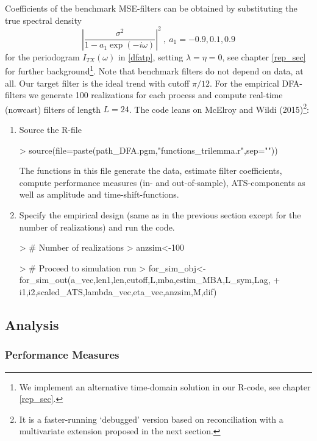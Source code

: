 \documentclass[a4paper]{book}
\begin{document}
Coefficients of the benchmark MSE-filters can be obtained by substituting the true spectral density
\[\left|\frac{\sigma^2}{1-a_1\exp(-i\omega)}\right|^2~,~a_1=-0.9,0.1,0.9\]
for the periodogram $I_{TX}(\omega)$ in \ref{dfatp}, setting $\lambda=\eta=0$, see chapter \ref{rep_sec} for further background\footnote{We implement an alternative time-domain solution in our R-code, see chapter \ref{rep_sec}.}. Note that benchmark filters do not depend on data, at all. Our target filter is the ideal trend with cutoff $\pi/12$.  
For the empirical DFA-filters we generate 100 realizations for each process and compute real-time (nowcast) filters of length $L=24$. The code leans on McElroy and Wildi (2015)\footnote{It is a faster-running `debugged' version based on reconciliation with a multivariate extension proposed in the next section.}:
\begin{enumerate}
\item Source the R-file
\begin{Schunk}
\begin{Sinput}
> source(file=paste(path_DFA.pgm,"functions_trilemma.r",sep=""))
\end{Sinput}
\end{Schunk}
The functions in this file generate the data, estimate filter coefficients, compute performance measures (in- and out-of-sample), ATS-components as well as amplitude and time-shift-functions. 
\item Specify the empirical design (same as in the previous section except for the number of realizations) and run the code. 
\begin{Schunk}
\begin{Sinput}
> # Number of realizations
> anzsim<-100
\end{Sinput}
\end{Schunk}
\begin{Schunk}
\begin{Sinput}
> # Proceed to simulation run
> for_sim_obj<-for_sim_out(a_vec,len1,len,cutoff,L,mba,estim_MBA,L_sym,Lag,
+                       i1,i2,scaled_ATS,lambda_vec,eta_vec,anzsim,M,dif)
\end{Sinput}
\end{Schunk}
\end{enumerate}

\subsection{Analysis}


\subsubsection{Performance Measures}
\end{document}
